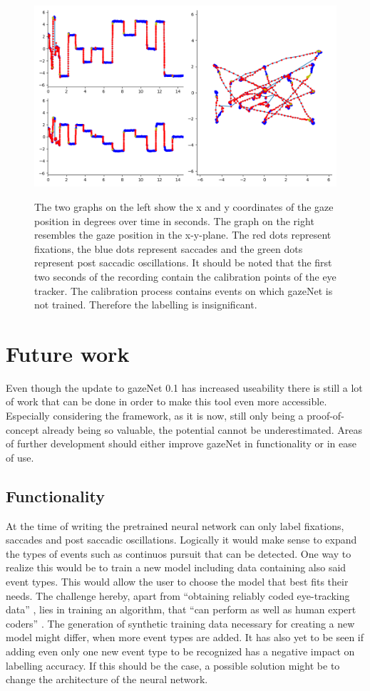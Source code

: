 \documentclass[conference]{IEEEtran}
\begin{document}
\begin{figure}
    \centering
    \includegraphics[width=0.6\linewidth]
    {Kreuze_Random Recording1_short}
    \label{fig:kreuze}
    \caption{The two graphs on the left show the x and y coordinates of the gaze position in degrees over time in seconds. The graph on the right resembles the gaze position in the x-y-plane. The red dots represent fixations, the blue dots represent saccades and the green dots represent post saccadic oscillations. It should be noted that the first two seconds of the recording contain the calibration points of the eye tracker. The calibration process contains events on which gazeNet is not trained. Therefore the labelling is insignificant.}
\end{figure}

\section{Future work}
Even though the update to gazeNet 0.1 has increased useability there is still a lot of work that can be done in order to make this tool even more accessible. Especially considering the framework, as it is now, still only being a proof-of-concept already being so valuable, the potential cannot be underestimated. Areas of further development should either improve gazeNet in functionality or in ease of use.

\subsection{Functionality}
At the time of writing the pretrained neural network can only label fixations, saccades and post saccadic oscillations. Logically it would make sense to expand the types of events such as continuos pursuit that can be detected. One way to realize this would be to train a new model including data containing also said event types. This would allow the user to choose the model that best fits their needs. The challenge hereby, apart from ``obtaining reliably coded eye-tracking data'' \cite{zemblys2018gazeNet}, lies in training an algorithm, that ``can perform as well as human expert coders'' \cite{zemblys2018gazeNet}. The generation of synthetic training data necessary for creating a new model might differ, when more event types are added. It has also yet to be seen if adding even only one new event type to be recognized has a negative impact on labelling accuracy. If this should be the case, a possible solution might be to change the architecture of the neural network.
\end{document}
